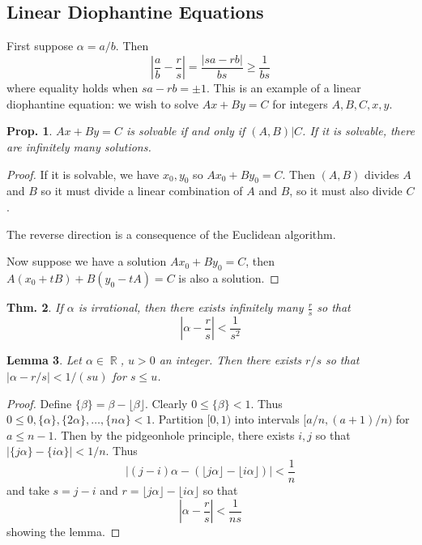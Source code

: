 \documentclass[12pt, a4paper]{book}
\DeclareMathOperator{\R}{\mathbb{R}}
\newtheorem{theorem}{Thm.}[section]
\newtheorem{lemma}[theorem]{Lemma}
\newtheorem{proposition}[theorem]{Prop.}
\theoremstyle{nonumberplain}
\newtheorem{proof}{Proof}
\begin{document}
\subsection{Linear Diophantine Equations}
First suppose $\alpha=a/b$.
Then
\[\left\lvert\frac{a}{b}-\frac{r}{s}\right\rvert=\frac{|sa-rb|}{bs}\geq\frac{1}{bs}\]
where equality holds when $sa-rb=\pm1$.
This is an example of a linear diophantine equation: we wish to solve $Ax+By=C$ for integers $A,B,C,x,y$.
\begin{proposition}
    $Ax+By=C$ is solvable if and only if $(A,B)|C$.
    If it is solvable, there are infinitely many solutions.
\end{proposition}
\begin{proof}
    If it is solvable, we have $x_0,y_0$ so $Ax_0+By_0=C$.
    Then $(A,B)$ divides $A$ and $B$ so it must divide a linear combination of $A$ and $B$, so it must also divide $C$.

    The reverse direction is a consequence of the Euclidean algorithm.

    Now suppose we have a solution $Ax_0+By_0=C$, then $A(x_0+tB)+B(y_0-tA)=C$ is also a solution.
\end{proof}
\begin{theorem}
    If $\alpha$ is irrational, then there exists infinitely many $\frac{r}{s}$ so that
    \[\left\lvert\alpha-\frac{r}{s}\right\rvert<\frac{1}{s^2}\]
\end{theorem}
\begin{lemma}
    Let $\alpha\in\R$, $u>0$ an integer.
    Then there exists $r/s$ so that $|\alpha-r/s|<1/(su)$ for $s\leq u$.
\end{lemma}
\begin{proof}
    Define $\{\beta\}=\beta-\lfloor\beta\rfloor$.
    Clearly $0\leq\{\beta\}<1$.
    Thus $0\leq0,\{\alpha\},\{2\alpha\},\ldots,\{n\alpha\}<1$.
    Partition $[0,1)$ into intervals $[a/n,(a+1)/n)$ for $a\leq n-1$.
    Then by the pidgeonhole principle, there exists $i,j$ so that $|\{j\alpha\}-\{i\alpha\}|<1/n$.
    Thus
    \begin{equation*}
        \left\lvert (j-i)\alpha-(\lfloor j\alpha\rfloor-\lfloor i\alpha\rfloor)\right\rvert<\frac{1}{n}
    \end{equation*}
    and take $s=j-i$ and $r=\lfloor j\alpha\rfloor-\lfloor i\alpha\rfloor$ so that
    \begin{equation*}
        \left\lvert\alpha-\frac{r}{s}\right\rvert<\frac{1}{ns}
    \end{equation*}
    showing the lemma.
\end{proof}
\end{document}
